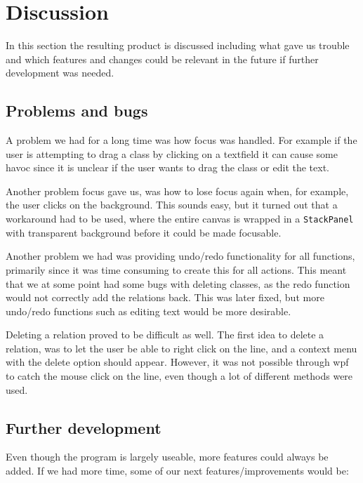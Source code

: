 \section{Discussion}
In this section the resulting product is discussed including what gave us trouble and
which features and changes could be relevant in the future if further
development was needed.

\subsection{Problems and bugs}
A problem we had for a long time was how focus was handled. For example if the
user is attempting to drag a class by clicking on a textfield it can cause some
havoc since it is unclear if the user wants to drag the class or edit the text. 

Another problem focus gave us, was how to lose focus again when, for example, 
the
user clicks on the background. This sounds easy, but it turned out that a
workaround had to be used, where the entire canvas is wrapped in a
\texttt{StackPanel} with transparent background before it could be made
focusable.

Another problem we had was providing undo/redo functionality for all functions,
primarily since it was time consuming to create this for all actions. This meant
that we at some point had some bugs with deleting classes, as the redo function
would not correctly add the relations back. This was later fixed, but more
undo/redo functions such as editing text would be more desirable. 

Deleting a relation proved to be difficult as well. The first idea to delete a
relation, was to let the user be able to right click on the line, and a context
menu with the delete option should appear. However, it was not possible through
wpf to catch the mouse click on the line, even though a lot of different methods
were used.

\subsection{Further development}
Even though the program is largely useable, more features could always be added.
If we had more time, some of our next features/improvements would be:

